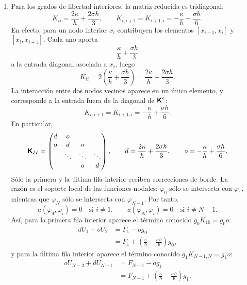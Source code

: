 \documentclass[11pt]{article}
\def\mat   #1{\mbox{\boldmath $\mathsf #1$}}
\begin{document}
\begin{enumerate}[label=\textbf{\arabic*.}, leftmargin=*]
\begin{enumerate}[label=(\alph*)]
        \item Para los grados de libertad interiores, la matriz reducida es tridiagonal:
        \[
            K_{ii}=\frac{2\kappa}{h}+\frac{2\sigma h}{3},
            \qquad
            K_{i,i+1}=K_{i+1,i}=-\frac{\kappa}{h}+\frac{\sigma h}{6}.
        \]
        En efecto, para un nodo interior $x_i$ contribuyen los elementos $[x_{i-1},x_i]$ y $[x_i,x_{i+1}]$. Cada uno aporta
        \[
            \frac{\kappa}{h}+\frac{\sigma h}{3}
        \]
        a la entrada diagonal asociada a $x_i$, luego
        \[
            K_{ii}
            =
            2\left(\frac{\kappa}{h}+\frac{\sigma h}{3}\right)
            =
            \frac{2\kappa}{h}+\frac{2\sigma h}{3}.
        \]
        La interacción entre dos nodos vecinos aparece en un único elemento, y corresponde a la entrada fuera de la diagonal de $\mat K^e$:
        \[
            K_{i,i+1}=K_{i+1,i}
            =
            -\frac{\kappa}{h}+\frac{\sigma h}{6}.
        \]
        En particular,
        \[
            \mat K_{II}=
            \begin{pmatrix}
                d&o& & \\
                o&d&o& \\
                 &\ddots&\ddots&\ddots\\
                 & &o&d
            \end{pmatrix},
            \qquad
            d=\frac{2\kappa}{h}+\frac{2\sigma h}{3},
            \qquad
            o=-\frac{\kappa}{h}+\frac{\sigma h}{6}.
        \]
        Sólo la primera y la última fila interior reciben correcciones de borde. La razón es el soporte local de las funciones nodales: $\varphi_0$ sólo se intersecta con $\varphi_1$, mientras que $\varphi_N$ sólo se intersecta con $\varphi_{N-1}$. Por tanto,
        \[
            a(\varphi_0,\varphi_i)=0\quad\text{si }i\neq1,
            \qquad
            a(\varphi_N,\varphi_i)=0\quad\text{si }i\neq N-1.
        \]
        Así, para la primera fila interior aparece el término conocido $g_0K_{10}=g_0o$:
        \[
        \begin{aligned}
            dU_1+oU_2
            &=
            F_1-og_0\\
            &=
            F_1+\left(\frac{\kappa}{h}-\frac{\sigma h}{6}\right)g_0,
        \end{aligned}
        \]
        y para la última fila interior aparece el término conocido $g_1K_{N-1,N}=g_1o$:
        \[
        \begin{aligned}
            oU_{N-2}+dU_{N-1}
            &=
            F_{N-1}-og_1\\
            &=
            F_{N-1}+\left(\frac{\kappa}{h}-\frac{\sigma h}{6}\right)g_1.
        \end{aligned}
        \]
    \end{enumerate}


\end{enumerate}
\end{document}
